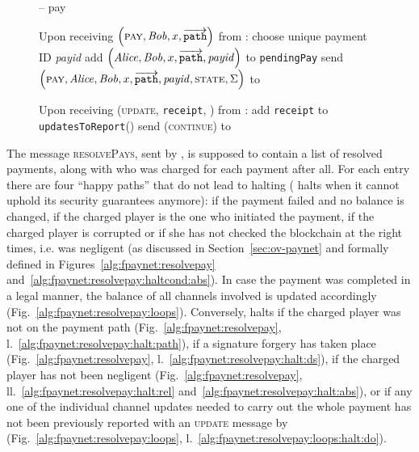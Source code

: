   \begin{figure}[H]
    \begin{systembox}{\fpaynet{} -- pay}
      \begin{algorithmic}[1]
        \State Upon receiving $\left(\textsc{pay}, \mathit{Bob}, x,
        \overrightarrow{\mathtt{path}}\right)$ from \alice:
        \Indent
          \State choose unique payment ID \textit{payid}
          \State add $\left(\mathit{Alice}, \mathit{Bob}, x, \overrightarrow{\mathtt{path}},
          \mathit{payid}\right)$ to \texttt{pendingPay}
          \State send $\left(\textsc{pay}, \mathit{Alice}, \mathit{Bob}, x,
          \overrightarrow{\mathtt{path}}, \mathit{payid}, \textsc{state},
          \Sigma\right)$ to \simulator
          \label{alg:fpaynet:pay:send}
        \EndIndent
        \Statex

        \State Upon receiving (\textsc{update}, \texttt{receipt}, \alice) from
        \simulator:
        \label{alg:fpaynet:update}
        \Indent
          \State add \texttt{receipt} to \texttt{updatesToReport}(\alice)
          \label{alg:fpaynet:update:add}
          \State send (\textsc{continue}) to \simulator
        \EndIndent
      \end{algorithmic}
    \end{systembox}
    \caption{}
    \label{alg:fpaynet:pay}
  \end{figure}

  The message \textsc{resolvePays}, sent by \simulator{}, is supposed to contain
  a list of resolved payments, along with who was charged for each payment after
  all. For each entry there are four ``happy paths'' that do not lead to
  \fpaynet{} halting (\fpaynet{} halts when it cannot uphold its security
  guarantees anymore): if the payment failed and no balance is changed, if the
  charged player is the one who initiated the payment, if the charged player is
  corrupted or if she has not checked the blockchain at the right times, i.e.
  was negligent (as discussed in Section~\ref{sec:ov-paynet} and formally
  defined in Figures~\ref{alg:fpaynet:resolvepay}
  and~\ref{alg:fpaynet:resolvepay:haltcond:abs}). In case the payment was
  completed in a legal manner, the balance of all channels involved is updated
  accordingly (Fig.~\ref{alg:fpaynet:resolvepay:loops}). Conversely, \fpaynet{}
  halts if the charged player was not on the payment path
  (Fig.~\ref{alg:fpaynet:resolvepay},
  l.~\ref{alg:fpaynet:resolvepay:halt:path}), if a signature forgery has taken
  place (Fig.~\ref{alg:fpaynet:resolvepay},
  l.~\ref{alg:fpaynet:resolvepay:halt:ds}), if the charged player has not been
  negligent (Fig.~\ref{alg:fpaynet:resolvepay},
  ll.~\ref{alg:fpaynet:resolvepay:halt:rel}
  and~\ref{alg:fpaynet:resolvepay:halt:abs}), or if any one of the individual
  channel updates needed to carry out the whole payment has not been previously
  reported with an \textsc{update} message by \simulator{}
  (Fig.~\ref{alg:fpaynet:resolvepay:loops},
  l.~\ref{alg:fpaynet:resolvepay:loops:halt:do}).

